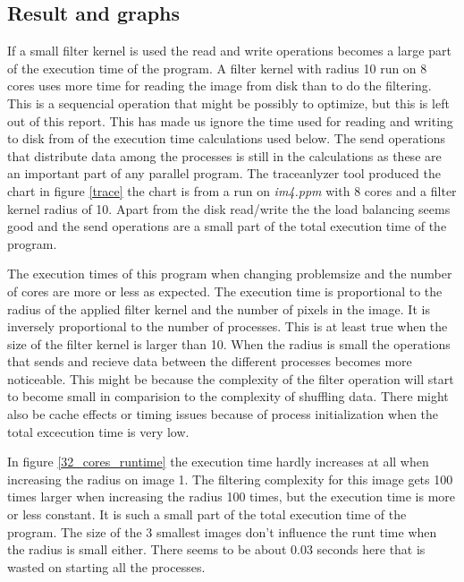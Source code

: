 \documentclass[a4paper,11pt]{article}
\begin{document}
\subsection{Result and graphs}

If a small filter kernel is used the read and write operations becomes a large part of the execution time of the program.
A filter kernel with radius 10 run on 8 cores uses more time for reading the image from disk than to do the filtering.
This is a sequencial operation that might be possibly to optimize, but this is left out of this report.
This has made us ignore the time used for reading and writing to disk from of the execution time calculations used below.
The send operations that distribute data among the processes is still in the calculations as these are an important part of any parallel program.
The traceanlyzer tool produced the chart in figure \ref{trace} the chart is from a run on \emph{im4.ppm} with 8 cores and a filter kernel radius of 10.
Apart from the disk read/write the the load balancing seems good and the send operations are a small part of the total execution time of the program.

The execution times of this program when changing problemsize and the number of cores are more or less as expected.
The execution time is proportional to the radius of the applied filter kernel and the number of pixels in the image.
It is inversely proportional to the number of processes.
This is at least true when the size of the filter kernel is larger than 10.
When the radius is small the operations that sends and recieve data between the different processes becomes more noticeable.
This might be because the complexity of the filter operation will start to become small in comparision to the complexity of shuffling data.
There might also be cache effects or timing issues because of process initialization when the total excecution time is very low.

In figure \ref{32_cores_runtime} the execution time hardly increases at all when increasing the radius on image 1.
The filtering complexity for this image gets 100 times larger when increasing the radius 100 times, but the execution time is more or less constant.
It is such a small part of the total execution time of the program.
The size of the 3 smallest images don't influence the runt time when the radius is small either.
There seems to be about 0.03 seconds here that is wasted on starting all the processes.
\end{document}
